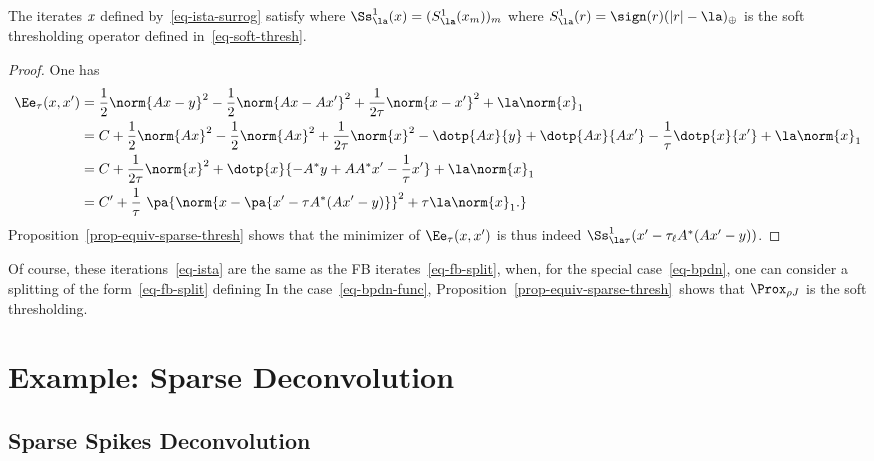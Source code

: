\begin{prop}
	The iterates $\it{x}$ defined by~\eqref{eq-ista-surrog} satisfy
	where $\Ss^1_\la(x) = (  S^1_\la(x_m) )_m$ where $S^1_\la(r) = \sign(r) (|r|-\la)_\oplus$ is the soft thresholding operator defined in~\eqref{eq-soft-thresh}. 
\end{prop}
\begin{proof}
	One has 
	\begin{align*}
		\Ee_\tau(x,x') &= \frac{1}{2}\norm{Ax-y}^2 - \frac{1}{2}\norm{Ax-Ax'}^2 + \frac{1}{2\tau}\norm{x-x'}^2 + \la \norm{x}_1 \\
			& = C + \frac{1}{2}\norm{Ax}^2-\frac{1}{2}\norm{Ax}^2+\frac{1}{2\tau}\norm{x}^2
			- \dotp{Ax}{y} + \dotp{Ax}{Ax'} - \frac{1}{\tau}\dotp{x}{x'}
			+ \la \norm{x}_1 \\
			& = C + \frac{1}{2\tau}\norm{x}^2 + \dotp{x}{ -A^*y+AA^*x'-\frac{1}{\tau}x' } + \la \norm{x}_1 \\
			&= C' + \frac{1}{\tau} \pa{
				\norm{ x - \pa{ x'-\tau A^*(Ax'-y) } }^2 + \tau \la \norm{x}_1.
			}
	\end{align*}
	Proposition~\eqref{prop-equiv-sparse-thresh} shows that the minimizer of $\Ee_\tau(x,x')$ is thus 
	indeed $\Ss^1_{\la\tau}( x' - \tau_\ell A^*( A x' - y ) )$.
\end{proof}

Of course, these iterations~\eqref{eq-ista} are the same as the FB iterates~\eqref{eq-fb-split}, when, for the special case~\eqref{eq-bpdn}, one can consider a splitting of the form~\eqref{eq-fb-split} defining
%
In the case~\eqref{eq-bpdn-func}, Proposition~\eqref{prop-equiv-sparse-thresh} shows that $\Prox_{\rho J}$ is the soft thresholding.



\section{Example: Sparse Deconvolution}


\subsection{Sparse Spikes Deconvolution}

